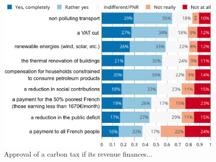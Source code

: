 \documentclass[english,5p,authoryear]{elsarticle}
\begin{document}


\begin{figure}[!htbp]
\centering
\includegraphics[width=\columnwidth]{Images_EPS/tax_condition_valc.eps}
\caption{Approval of a carbon tax if its revenue finances...}
\label{fig:recycling}
\end{figure}
\end{document}
